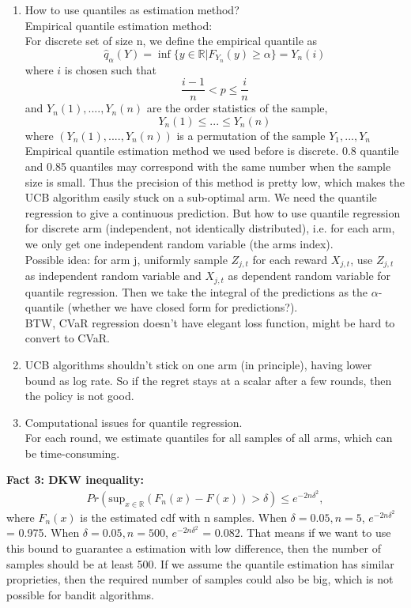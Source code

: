 \documentclass{article}
\begin{document}
\begin{enumerate}
\begin{enumerate}
    \item How to use quantiles as estimation method?\\
    Empirical quantile estimation method: \\
    For discrete set of size n, we define the empirical quantile as
    $$\hat{q}_\alpha(Y) = \inf \{y \in \mathbb{R}| F_{Y_n} (y) \geq \alpha\} = Y_n(i)$$
    where $i$ is chosen such that
    $$\frac{i-1}{n} < p \leq \frac{i}{n}$$
    and $Y_n(1), ...., Y_n(n)$ are the order statistics of the sample,
    $$Y_n(1)\leq ...\leq Y_n(n)$$ 
    where $(Y_n(1), ...., Y_n(n))$ is a permutation of the sample $Y_1, ..., Y_n$\\
        
    Empirical quantile estimation method we used before is discrete. 0.8 quantile and 0.85 quantiles may correspond with the same number when the sample size is small. Thus the precision of this method is pretty low, which makes the UCB algorithm easily stuck on a sub-optimal arm. 
    We need the quantile regression to give a continuous prediction. But how to use quantile regression for discrete arm (independent, not identically distributed), i.e. for each arm, we only get one independent random variable (the arms index).\\
    Possible idea: for arm j, uniformly sample $Z_{j,t}$ for each reward $X_{j, t}$, use $Z_{j,t}$ as independent random variable  and $X_{j, t}$ as dependent random variable for quantile regression. Then we take the integral of the predictions as the $\alpha$-quantile (whether we have closed form for predictions?). \\
    BTW, CVaR regression doesn't have elegant loss function, might be hard to convert to CVaR.
    
    \item UCB algorithms shouldn't stick on one arm (in principle), having lower bound as log rate. So if the regret stays at a scalar after a few rounds, then the policy is not good.
    
    \item Computational issues for quantile regression. \\
    For each round, we estimate quantiles for all samples of all arms, which can be time-consuming. 
    
    \end{enumerate}
    
\textbf{Fact 3: DKW inequality:}
\begin{align}
    Pr(\text{sup}_{x \in \mathbb{R}}(F_n(x) - F(x)) > \delta) \leq e ^ {-2n\delta^2}, 
\end{align}
where $F_n(x)$ is the estimated cdf with n samples. When $\delta = 0.05, n =5$, $e ^ {-2n\delta^2}$ = 0.975. When $\delta = 0.05, n =500$, $e ^ {-2n\delta^2}$ = 0.082. That means if we want to use this bound to guarantee a estimation with low difference, then the number of samples should be at least 500.
If we assume the quantile estimation has similar proprieties, then the required number of samples could also be big, which is not possible for bandit algorithms. 
\end{enumerate}

\printbibliography
\end{document}

